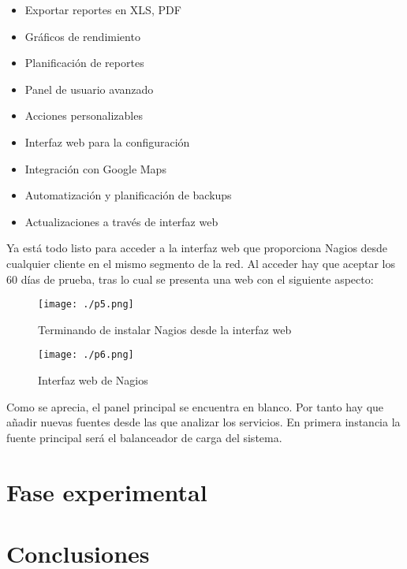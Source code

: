 \documentclass[paper=a4, fontsize=12pt]{scrartcl} %
\begin{document}
\begin{itemize}
	\item Exportar reportes en XLS, PDF
	\item Gráficos de rendimiento
	\item Planificación de reportes
	\item Panel de usuario avanzado
	\item Acciones personalizables
	\item Interfaz web para la configuración
	\item Integración con Google Maps
	\item Automatización y planificación de backups
	\item Actualizaciones a través de interfaz web
\end{itemize}

Ya está todo listo para acceder a la interfaz web que proporciona Nagios desde cualquier cliente en el mismo segmento de la red. Al acceder hay que aceptar los 60 días de prueba, tras lo cual se presenta una web con el siguiente aspecto:

\begin{figure}[H] %
	\centering
	\label{lsblk}
	\texttt{[image: ./p5.png]}
	\caption{Terminando de instalar Nagios desde la interfaz web} 
\end{figure}

\begin{figure}[H] %
	\centering
	\label{lsblk}
	\texttt{[image: ./p6.png]}
	\caption{Interfaz web de Nagios} 
\end{figure}

Como se aprecia, el panel principal se encuentra en blanco. Por tanto hay que añadir nuevas fuentes desde las que analizar los servicios.
En primera instancia la fuente principal será el balanceador de carga del sistema. 
\section{Fase experimental}

\section{Conclusiones}


\end{document}
